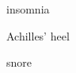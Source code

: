 \begin{word}{insomnia}
\end{word}

\begin{word}{Achilles' heel}
\end{word}

\begin{word}{snore}
\end{word}